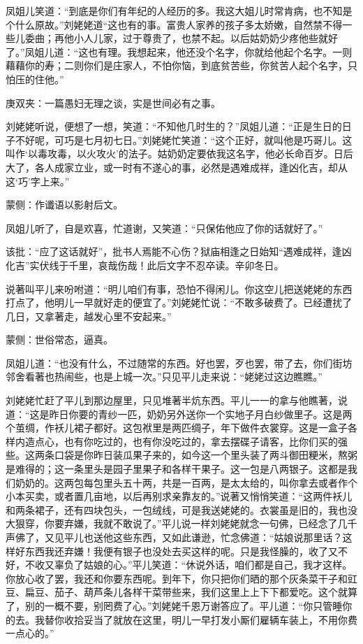\begin{parag}
    凤姐儿笑道：“到底是你们有年纪的人经历的多。我这大姐儿时常肯病，也不知是个什么原故。”刘姥姥道“这也有的事。富贵人家养的孩子多太娇嫩，自然禁不得一些儿委曲；再他小人儿家，过于尊贵了，也禁不起。以后姑奶奶少疼他些就好了。”凤姐儿道：“这也有理。我想起来，他还没个名字，你就给他起个名字。一则藉藉你的寿；二则你们是庄家人，不怕你恼，到底贫苦些，你贫苦人起个名字，只怕压的住他。”\begin{note}庚双夹：一篇愚妇无理之谈，实是世间必有之事。\end{note}刘姥姥听说，便想了一想，笑道：“不知他几时生的？”凤姐儿道：“正是生日的日子不好呢，可巧是七月初七日。”刘姥姥忙笑道：“这个正好，就叫他是巧哥儿。这叫作‘以毒攻毒，以火攻火’的法子。姑奶奶定要依我这名字，他必长命百岁。日后大了，各人成家立业，或一时有不遂心的事，必然是遇难成祥，逢凶化吉，却从这‘巧’字上来。”\begin{note}蒙侧：作谶语以影射后文。\end{note}
\end{parag}


\begin{parag}
    凤姐儿听了，自是欢喜，忙道谢，又笑道：“只保佑他应了你的话就好了。”\begin{note} 该批：“应了这话就好”，批书人焉能不心伤？狱庙相逢之日始知“遇难成祥，逢凶化吉”实伏线于千里，哀哉伤哉！此后文字不忍卒读。辛卯冬日。\end{note}说著叫平儿来吩咐道：“明儿咱们有事，恐怕不得闲儿。你这空儿把送姥姥的东西打点了，他明儿一早就好走的便宜了。”刘姥姥忙说：“不敢多破费了。已经遭扰了几日，又拿著走，越发心里不安起来。”\begin{note}蒙侧：世俗常态，逼真。\end{note}凤姐儿道：“也没有什么，不过随常的东西。好也罢，歹也罢，带了去，你们街坊邻舍看著也热闹些，也是上城一次。”只见平儿走来说：“姥姥过这边瞧瞧。”
\end{parag}


\begin{parag}
    刘姥姥忙赶了平儿到那边屋里，只见堆著半炕东西。平儿一一的拿与他瞧著，说道：“这是昨日你要的青纱一匹，奶奶另外送你一个实地子月白纱做里子。这是两个茧绸，作袄儿裙子都好。这包袱里是两匹绸子，年下做件衣裳穿。这是一盒子各样内造点心，也有你吃过的，也有你没吃过的，拿去摆碟子请客，比你们买的强些。这两条口袋是你昨日装瓜果子来的，如今这一个里头装了两斗御田粳米，熬粥是难得的；这一条里头是园子里果子和各样干果子。这一包是八两银子。这都是我们奶奶的。这两包每包里头五十两，共是一百两，是太太给的，叫你拿去或者作个小本买卖，或者置几亩地，以后再别求亲靠友的。”说著又悄悄笑道：“这两件袄儿和两条裙子，还有四块包头，一包绒线，可是我送姥姥的。衣裳虽是旧的，我也没大狠穿，你要弃嫌，我就不敢说了。”平儿说一样刘姥姥就念一句佛，已经念了几千声佛了，又见平儿也送他这些东西，又如此谦逊，忙念佛道：“姑娘说那里话？这样好东西我还弃嫌！我便有银子也没处去买这样的呢。只是我怪臊的，收了又不好，不收又辜负了姑娘的心。”平儿笑道：“休说外话，咱们都是自己，我才这样。你放心收了罢，我还和你要东西呢。到年下，你只把你们晒的那个灰条菜干子和豇豆、扁豆、茄子、葫芦条儿各样干菜带些来，我们这里上上下下都爱吃。这个就算了，别的一概不要，别罔费了心。”刘姥姥千恩万谢答应了。平儿道：“你只管睡你的去。我替你收拾妥当了就放在这里，明儿一早打发小厮们雇辆车装上，不用你费一点心的。”
\end{parag}


